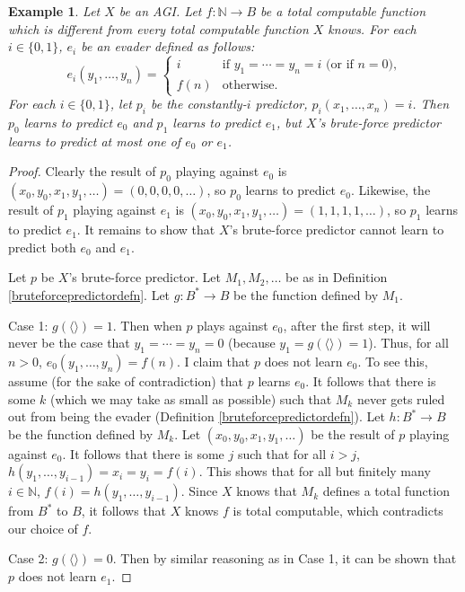 \documentclass{article}
\newtheorem{example}[theorem]{Example}
\begin{document}
\begin{example}
\label{bruteforcenottotallyoptimalexample}
    Let $X$ be an AGI. Let $f:\mathbb N\to B$ be a total computable function which
    is different from every total computable function $X$ knows.
    For each $i\in\{0,1\}$, $e_i$ be an evader defined as follows:
    \[
        e_i(y_1,\ldots,y_n) =
        \begin{cases}
            i &\mbox{if $y_1=\cdots=y_n=i$ (or if $n=0$),}\\
            f(n) &\mbox{otherwise.}
        \end{cases}
    \]
    For each $i\in\{0,1\}$, let $p_i$ be the
    constantly-$i$ predictor, $p_i(x_1,\ldots,x_n)=i$.
    Then $p_0$ learns to predict $e_0$ and $p_1$ learns to predict $e_1$,
    but $X$'s brute-force predictor learns to predict at most one of $e_0$ or $e_1$.
\end{example}

\begin{proof}
    Clearly the result of $p_0$ playing against $e_0$ is
    $(x_0,y_0,x_1,y_1,\ldots)=(0,0,0,0,\ldots)$, so $p_0$ learns to predict $e_0$.
    Likewise, the result of $p_1$ playing against $e_1$ is
    $(x_0,y_0,x_1,y_1,\ldots)=(1,1,1,1,\ldots)$, so $p_1$ learns to predict $e_1$.
    It remains to show that $X$'s brute-force predictor cannot learn to predict
    both $e_0$ and $e_1$.

    Let $p$ be $X$'s brute-force predictor.
    Let $M_1,M_2,\ldots$ be as in Definition \ref{bruteforcepredictordefn}.
    Let $g:B^*\to B$ be the function defined by $M_1$.

    Case 1: $g(\langle\rangle)=1$. Then when $p$ plays against $e_0$,
    after the first step, it will never be the case that
    $y_1=\cdots=y_n=0$ (because $y_1=g(\langle\rangle)=1$).
    Thus, for all $n>0$, $e_0(y_1,\ldots,y_n)=f(n)$.
    I claim that $p$ does not learn $e_0$.
    To see this, assume (for the sake of contradiction)
    that $p$ learns $e_0$. It follows that there is some $k$ (which we may take
    as small as possible) such that $M_k$ never gets ruled out from being the
    evader (Definition \ref{bruteforcepredictordefn}). Let $h:B^*\to B$ be the
    function defined by $M_k$.
    Let $(x_0,y_0,x_1,y_1,\ldots)$ be the result of $p$ playing against $e_0$.
    It follows that there is some $j$ such that for all $i>j$,
    $h(y_1,\ldots,y_{i-1})=x_i=y_i=f(i)$.
    This shows that for all but finitely many $i\in\mathbb N$,
    $f(i)=h(y_1,\ldots,y_{i-1})$. Since $X$ knows that $M_k$ defines a total
    function from $B^*$ to $B$, it follows that $X$ knows $f$ is total computable,
    which contradicts our choice of $f$.

    Case 2: $g(\langle\rangle)=0$. Then by similar reasoning as in Case 1,
    it can be shown that $p$ does not learn $e_1$.
\end{proof}
\end{document}
